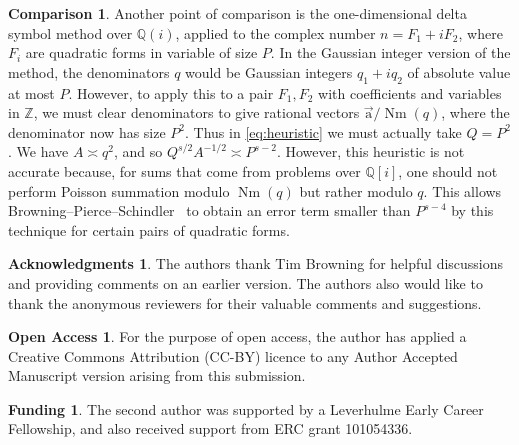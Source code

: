 \documentclass[letterpaper,11pt]{amsart}
\numberwithin{equation}{section}
\theoremstyle{definition}
\newtheorem*{ack}{Acknowledgments}
\newtheorem*{oa}{Open Access}
\newtheorem*{fund}{Funding}
\newtheorem{example}{Comparison}
\numberwithin{equation}{section}
\newcommand{\ua}{\vec{\mathrm{a}}}
\begin{document}
\begin{example}
Another point of comparison is the one-dimensional delta symbol method over $\mathbb Q(i)$, applied to the complex number \(n=F_1+iF_2\), where $F_i$ are quadratic forms in variable of size $P$. In the Gaussian integer version of the method, the denominators $q$  would be Gaussian integers $q_1+iq_2$ of absolute value at most $P$. However, to apply this to a pair \(F_1,F_2\) with coefficients and variables in $\mathbb Z$, we must clear denominators to give rational vectors \(\ua/\operatorname{Nm}(q)\), where the denominator now has size $P^2$. Thus in \eqref{eq:heuristic} we must actually take $Q=P^2$. We have $A\asymp q^2$, and so $Q^{s/2}A^{-1/2}\asymp P^{s-2}$. However, this heuristic is not accurate because, for sums that come from problems over $\mathbb Q[i]$, one should not perform Poisson summation modulo $\operatorname{Nm}(q)$ but rather modulo $q$. This allows Browning--Pierce--Schindler~\cite{BPS} to obtain an error term smaller than $P^{s-4}$ by this technique for certain pairs of quadratic forms. 
\end{example}

\begin{ack}
The authors thank Tim Browning for helpful discussions and providing comments on an earlier version. The authors also would like to thank the anonymous reviewers for their valuable comments and suggestions.
\end{ack}

\begin{oa}
    For the purpose of open access, the
author has applied a Creative Commons Attribution (CC-BY) licence to any Author Accepted
Manuscript version arising from this submission.
\end{oa}

\begin{fund}
The second author was supported by a Leverhulme Early Career Fellowship, and also received support from ERC grant 101054336. 
\end{fund}


\appendix
\end{document}
